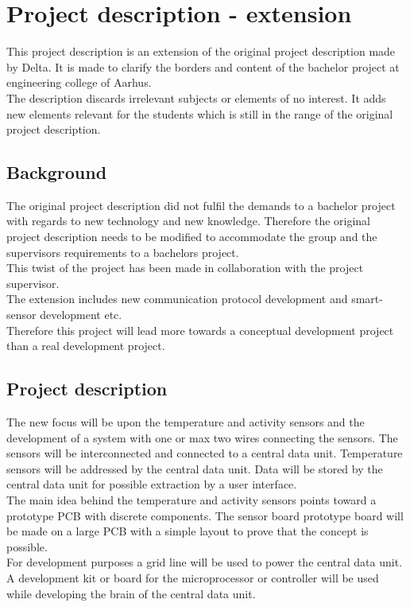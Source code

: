 \chapter{Project description - extension}
This project description is an extension of the original project description made by Delta. It is made to clarify the borders and content of the bachelor project at engineering college of Aarhus.\\
The description discards irrelevant subjects or elements of no interest. It adds new elements relevant for the students which is still in the range of the original project description.


\section{Background}
The original project description did not fulfil the demands to a bachelor project with regards to new technology and new knowledge. Therefore the original project description needs to be modified to accommodate the group and the supervisors requirements to a bachelors project. \\
This twist of the project has been made in collaboration with the project supervisor.\\
The extension includes new communication protocol development and smart-sensor development etc.\\
Therefore this project will lead more towards a conceptual development project than a real development project.\\


\section{Project description}
The new focus will be upon the temperature and activity sensors and the development of a system with one or max two wires connecting the sensors. The sensors will be interconnected and connected to a central data unit. Temperature sensors will be addressed by the central data  unit. Data will be stored by the central data unit for possible extraction by a user interface. \\

The main idea behind the temperature and activity sensors points toward a prototype PCB with discrete components. The sensor board prototype board will be made on a large PCB with a simple layout to prove that the concept is possible. \\

For development purposes a grid line will be used to power the central data unit. A development kit or board for the microprocessor or controller  will be used while developing the brain of the central data unit. \\

